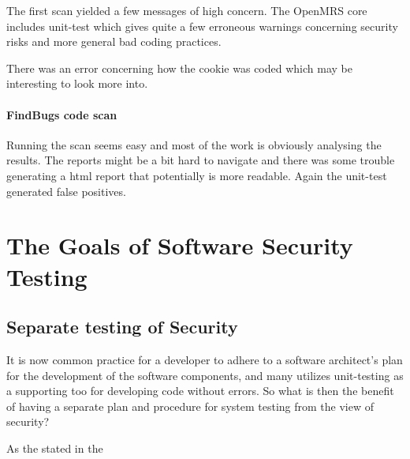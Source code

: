 \documentclass{article}
\begin{document}
  The first scan yielded a few messages of high concern. The OpenMRS core
  includes unit-test which gives quite a few erroneous warnings concerning
  security risks and more general bad coding practices. 

  There was an error concerning how the cookie was coded which may be
  interesting to look more into.

\paragraph{FindBugs code scan}

  Running the scan seems easy and most of the work is obviously analysing the
  results. The reports might be a bit hard to navigate and there was some
  trouble generating a html report that potentially is more readable. Again the
  unit-test generated false positives.

\section{The Goals of Software Security Testing}

\subsection{Separate testing of Security}

  It is now common practice  for a developer to adhere to a software architect's
  plan for the development of the software components, and many utilizes
  unit-testing as a supporting too for developing code without errors. So what
  is then the benefit of having a separate plan and procedure for system testing
  from the view of security?

  As the stated in the 
\end{document}
